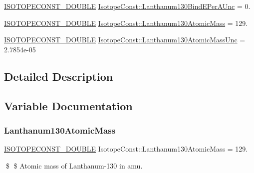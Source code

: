 \begin{DoxyCompactItemize}
\mbox{\hyperlink{group___isotope_const-_macros_ga8f45a7272ce02c0b4c65c44636ed719a}{I\+S\+O\+T\+O\+P\+E\+C\+O\+N\+S\+T\+\_\+\+D\+O\+U\+B\+LE}} \mbox{\hyperlink{group___isotope_const-_lanthanum-_la130_ga9cb34cdfe243da8ee01630c6e843dc63}{Isotope\+Const\+::\+Lanthanum130\+Bind\+E\+Per\+A\+Unc}} = 0.
\item 
\mbox{\hyperlink{group___isotope_const-_macros_ga8f45a7272ce02c0b4c65c44636ed719a}{I\+S\+O\+T\+O\+P\+E\+C\+O\+N\+S\+T\+\_\+\+D\+O\+U\+B\+LE}} \mbox{\hyperlink{group___isotope_const-_lanthanum-_la130_gab71833831561d16e7e05eed9ece4203b}{Isotope\+Const\+::\+Lanthanum130\+Atomic\+Mass}} = 129.
\item 
\mbox{\hyperlink{group___isotope_const-_macros_ga8f45a7272ce02c0b4c65c44636ed719a}{I\+S\+O\+T\+O\+P\+E\+C\+O\+N\+S\+T\+\_\+\+D\+O\+U\+B\+LE}} \mbox{\hyperlink{group___isotope_const-_lanthanum-_la130_gaaa362632fee8823f7ea5e3c8b4c69ebd}{Isotope\+Const\+::\+Lanthanum130\+Atomic\+Mass\+Unc}} = 2.\+7854e-\/05
\end{DoxyCompactItemize}


\subsection{Detailed Description}


\subsection{Variable Documentation}
\mbox{\label{group___isotope_const-_lanthanum-_la130_gab71833831561d16e7e05eed9ece4203b}} 
\subsubsection{\texorpdfstring{Lanthanum130\+Atomic\+Mass}{Lanthanum130AtomicMass}}
{\footnotesize\ttfamily \mbox{\hyperlink{group___isotope_const-_macros_ga8f45a7272ce02c0b4c65c44636ed719a}{I\+S\+O\+T\+O\+P\+E\+C\+O\+N\+S\+T\+\_\+\+D\+O\+U\+B\+LE}} Isotope\+Const\+::\+Lanthanum130\+Atomic\+Mass = 129.}

\$ \$ Atomic mass of Lanthanum-\/130 in amu. \mbox{\label{group___isotope_const-_lanthanum-_la130_gaaa362632fee8823f7ea5e3c8b4c69ebd}} 
